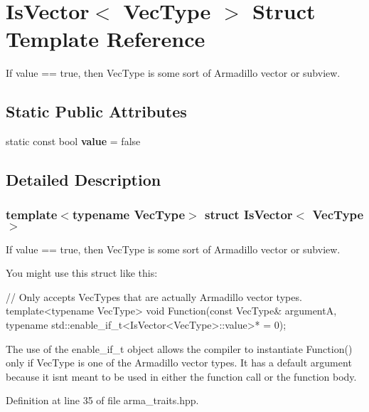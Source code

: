 \section{Is\+Vector$<$ Vec\+Type $>$ Struct Template Reference}
\label{structIsVector}


If value == true, then Vec\+Type is some sort of Armadillo vector or subview.  


\subsection*{Static Public Attributes}
\begin{DoxyCompactItemize}
\item 
static const bool \textbf{ value} = false
\end{DoxyCompactItemize}


\subsection{Detailed Description}
\subsubsection*{template$<$typename Vec\+Type$>$\newline
struct Is\+Vector$<$ Vec\+Type $>$}

If value == true, then Vec\+Type is some sort of Armadillo vector or subview. 

You might use this struct like this\+:


\begin{DoxyCode}
\textcolor{comment}{// Only accepts VecTypes that are actually Armadillo vector types.}
\textcolor{keyword}{template}<\textcolor{keyword}{typename} VecType>
\textcolor{keywordtype}{void} Function(\textcolor{keyword}{const} VecType& argumentA,
              \textcolor{keyword}{typename} std::enable_if_t<IsVector<VecType>::value>* = 0);
\end{DoxyCode}


The use of the enable\+\_\+if\+\_\+t object allows the compiler to instantiate Function() only if Vec\+Type is one of the Armadillo vector types. It has a default argument because it isn\textquotesingle{}t meant to be used in either the function call or the function body. 

Definition at line 35 of file arma\+\_\+traits.\+hpp.



